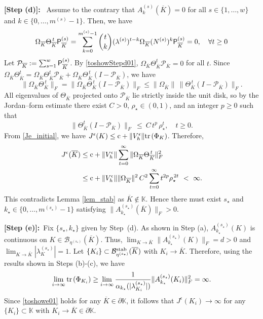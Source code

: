 \documentclass[preprint,5p,times,twocolumn]{elsarticle}
\def\tr{{\rm tr} \hspace{0.5mm}}
\begin{document}
{\bf [Step (d)]:}~ Assume to the contrary that $A_k^{(s)}(\overline K)=0$ for all $s\in\{1,\dots,w\}$ and $k \in \{0,\dots,m^{(s)}-1\}$. Then, we have
\begin{align}
\Omega_{\overline K}\Theta_{\overline K}^{\,t}{\sf P}^{(s)}_{\overline{K}}
=\sum_{k=0}^{m^{(s)}-1}\binom{t}{k}(\lambda^{(s)})^{t-k}\Omega_{\overline K}(N^{(s)})^{k}{\sf P}^{(s)}_{\overline{K}} =0, \quad \forall t \geq 0 \label{toshowStepd01}
\end{align}
Let ${\mathcal P}_{\overline{K}} := \sum_{s=1}^w {\sf P}^{(s)}_{\overline{K}}$. By \eqref{toshowStepd01}, $\Omega_{\overline K}\Theta_{\overline K}^{t}{\mathcal P}_{\overline{K}}=0$ for all $t$. Since
$
\Omega_{\overline K}\Theta_{\overline K}^{t}
=\Omega_{\overline K}\Theta_{\overline K}^{t}{\mathcal P}_{\overline{K}} + \Omega_{\overline K}\Theta_{\overline K}^{\,t}(I-{\mathcal P}_{\overline{K}})
$, we have 
\[
\|\Omega_{\overline K}\Theta_{\overline K}^{\,t}\|_F
=\|\Omega_{\overline K}\Theta_{\overline K}^{\,t}(I-{\mathcal P}_{\overline{K}})\|_F
\le \|\Omega_{\overline K}\|\,\|\Theta_{\overline K}^{\,t}(I-{\mathcal P}_{\overline{K}})\|_F.
\]
All eigenvalues of $\Theta_{\overline K}$ projected onto ${\mathcal P}_{\overline{K}}$ lie strictly inside the unit disk, so by the Jordan–form estimate there exist $C>0$, $\rho_\star\in(0,1)$, and an integer $p\ge0$ such that
\[
\|\Theta_{\overline K}^{t}(I-{\mathcal P}_{\overline{K}})\|_F \ \le\ C\,t^{p}\,\rho_\star^{t}, \quad t \geq 0. 
\]
From \eqref{Je_initial}, we have $J^{\epsilon}(K) \leq {\rm c} + \|V_h^{\epsilon}\| \tr(\Phi_K)$. Therefore, 
\begin{align}
J^{\epsilon}(\overline K) &\leq {\rm c} + \|V_h^{\epsilon}\|\sum_{t=0}^\infty \|\Omega_{\overline K}\Theta_{\overline K}^{\,t}\|_F^2 \nonumber \\
 &\leq {\rm c} +\|V_h^{\epsilon}\|\|\Omega_{\overline K}\|^2\,C^2\sum_{t=0}^\infty t^{2p}\rho_\star^{\,2t}\ <\ \infty.
\end{align}
This contradicts Lemma \ref{lem_stab} as $\overline{K} \notin \mathbb K$. Hence there must exist
$s_\star$ and $k_\star\in\{0,\dots,m^{(s_\star)}\!-1\}$ satisfying $\|A_{k_\star}^{(s_\star)}(\overline K)\|_F>0$.

{\bf [Step (e)]:}~Fix $\{s_\star,k_\star\}$ given by Step~(d). As shown in Step (a), $A_{k_\star}^{(s_\star)}(K)$ is continuous on $K \in \mathcal B_{\eta^{(s_{\star})}}(\overline{K})$. Thus, $\lim_{K \to \overline{K}} \|A_{k_\star}^{(s_\star)}(K)\|_F = d >0$ and $\lim_{K \to \overline{K}} |\lambda_K^{(s_{\star})}| = 1$. Let $\{K_i\} \subset \mathcal B_{\eta^{(s_\star)}}^{\rm stab}(\overline{K})$ with $K_i\to\overline K$. Therefore, using the results shown in Steps (b)-(c), we have 
\begin{align}
    \lim_{i \to \infty} \tr(\Phi_{K_i}) \geq \lim_{i \to \infty}\frac{1}{\alpha_{k_{\star}}(|\lambda_{K_i}^{(s_{\star})}|)} \|A_{k_{\star}}^{(s_{\star})}(K_i)\|_F^2 = \infty. \label{toshowe01}
\end{align}
Since \eqref{toshowe01} holds for any $\overline{K} \in \partial \mathbb K$, it follows that $J^\epsilon(K_i)\to\infty$ for any $\{K_i\}\subset\mathbb K$ with $K_i\to\overline K\in\partial\mathbb K$.
\end{document}
